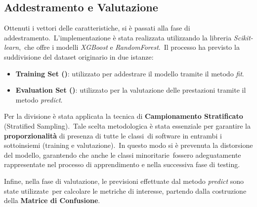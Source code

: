 \subsection{Addestramento e Valutazione}

Ottenuti i vettori delle caratteristiche, si è passati alla fase di addestramento.\
L'implementazione è stata realizzata utilizzando la libreria \textit{Scikit-learn},\
che offre i modelli \textit{XGBoost} e \textit{RandomForest}.\
Il processo ha previsto la suddivisione del dataset originario in due istanze:
\begin{itemize}
    \item \textbf{Training Set (\percc{80})}: utilizzato per addestrare il modello tramite il metodo \textit{fit}.
    \item \textbf{Evaluation Set (\percc{20})}: utilizzato per la valutazione delle prestazioni tramite il metodo \textit{predict}.
\end{itemize}

Per la divisione è stata applicata la tecnica di \textbf{Campionamento Stratificato} (Stratified Sampling).\
Tale scelta metodologica è stata essenziale per garantire la \textbf{proporzionalità} di presenza di tutte le classi\
di software in entrambi i sottoinsiemi (training e valutazione).\
In questo modo si è prevenuta la distorsione del modello, garantendo che anche le classi minoritarie\
fossero adeguatamente rappresentate nel processo di apprendimento e nella successiva fase di testing.

Infine, nella fase di valutazione, le previsioni effettuate dal metodo \textit{predict} sono state utilizzate\
per calcolare le metriche di interesse, partendo dalla costruzione della \textbf{Matrice di Confusione}.